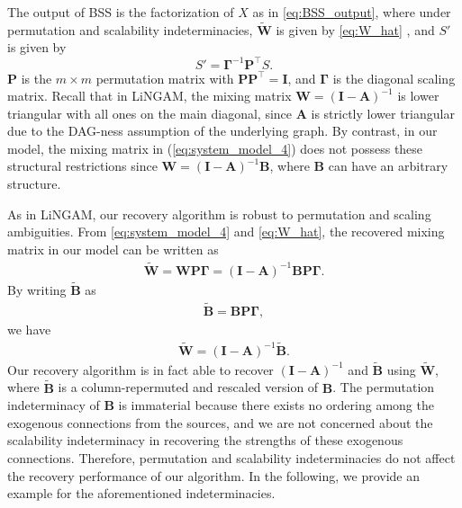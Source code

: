 \documentclass[12pt]{article}
\newcommand{\bA}{\mathbf{A}}
\newcommand{\bB}{\mathbf{B}}
\newcommand{\bW}{\mathbf{W}}
\newcommand{\bI}{\mathbf{I}}
\begin{document}
The output of BSS is the factorization of $X$ as in \eqref{eq:BSS_output}, where under permutation and scalability indeterminacies, $\tilde{\bW}$ is given by \eqref{eq:W_hat} , and $S'$ is given by
\begin{equation*}
S' = \mathbf{\Gamma}^{-1}\mathbf{P}^{\top} S.
\end{equation*}
$\mathbf{P}$ is the $m\times m$ permutation matrix with $\mathbf{P}\mathbf{P}^{\top}=\bI$, and $\mathbf{\Gamma}$ is the diagonal scaling matrix. Recall that in LiNGAM, the mixing matrix $\mathbf{W}=(\bI - \bA)^{-1}$ is lower triangular with all ones on the main diagonal, since $\bA$ is strictly lower triangular due to the DAG-ness assumption of the underlying graph. By contrast, in our model, the mixing matrix in (\ref{eq:system_model_4}) does not possess these structural restrictions since $\mathbf{W}=(\bI - \bA)^{-1}\bB$, where $\bB$ can have an arbitrary structure. 

As in LiNGAM, our recovery algorithm is robust to permutation and scaling ambiguities. From \eqref{eq:system_model_4} and \eqref{eq:W_hat}, the recovered mixing matrix in our model can be written as 
\begin{align}
\tilde{\bW} =\bW \mathbf{P} \mathbf{\Gamma}=(\bI - \bA)^{-1} \bB \mathbf{P} \mathbf{\Gamma}.\nonumber
\label{eq:bssrecovery0}
\end{align}
By writing $\tilde{\bB}$ as 
\begin{align}
\label{eq:B_tilde}
\tilde{\bB} = \bB \mathbf{P} \mathbf{\Gamma},
\end{align} 
we have 
\begin{align}
\tilde{\bW} =(\bI - \bA)^{-1} \tilde{\bB}.
\label{eq:bssrecovery1}
\end{align}
Our recovery algorithm is in fact able to recover $(\bI-\bA)^{-1}$ and $\tilde{\bB}$ using $\tilde{\bW}$, where $\tilde{\bB}$ is a column-repermuted and rescaled version of $\bB$. The permutation indeterminacy of $\bB$ is immaterial because there exists no ordering among the exogenous connections from the sources, and we are not concerned about the scalability indeterminacy in recovering the strengths of these exogenous connections. Therefore, permutation and scalability indeterminacies do not affect the recovery performance of our algorithm. In the following, we provide an example for the aforementioned indeterminacies.  
\end{document}
